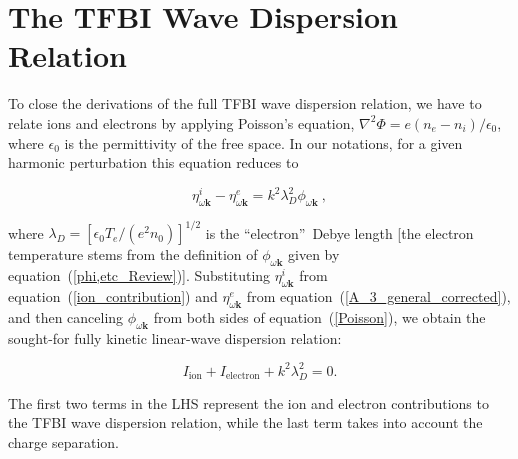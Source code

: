 \documentclass[draft]{agujournal2019}
\renewcommand{\vec}{\mathbf}
\begin{document}
{\section{The TFBI Wave Dispersion
Relation\label{TFBI wave dispersion relation}}

To close the derivations of the full TFBI wave dispersion relation, we have to relate
ions and electrons by applying Poisson's equation, $\nabla^{2}\Phi=e(n_{e}-n_{i})/\epsilon_{0}$, where $\epsilon_{0}$ is the
permittivity of the free space. In our notations, for a given
harmonic perturbation this equation reduces to
\begin{linenomath*}
\begin{equation}
\eta_{\omega\vec{k}}^{i}-\eta
_{\omega\vec{k}}^{e}=k^{2}\lambda_{D}^{2}\phi_{\omega\vec{k}}\ , 
\label{Poisson}
\end{equation}
\end{linenomath*}
where $\lambda_{D}=[\epsilon_{0}T_{e}/(e^{2}n_{0})]^{1/2}$ is the
\textquotedblleft electron\textquotedblright\ Debye length [the electron
temperature stems from the definition of $\phi_{\omega\vec{k}}$ given by
equation~(\ref{phi,etc_Review})]. Substituting $\eta_{\omega\vec{k}}^{i}$
from equation~(\ref{ion_contribution}) and $\eta_{\omega\vec{k}}^{e}$ from
equation~(\ref{A_3_general_corrected}), and then canceling $\phi_{\omega\vec{k}}$ from both
sides of equation~(\ref{Poisson}), we obtain the sought-for fully kinetic linear-wave dispersion
relation:
\begin{linenomath*}
\begin{equation}
I_{\mathrm{ion}}+I_{\mathrm{electron}}+k^{2}\lambda_{D}^{2}=0.
\label{Final_dispersion_relation}
\end{equation}
\end{linenomath*}
The first two terms in the LHS represent the ion and electron contributions to the TFBI wave dispersion relation, while the last term 
takes into account the charge separation.

}
\end{document}
